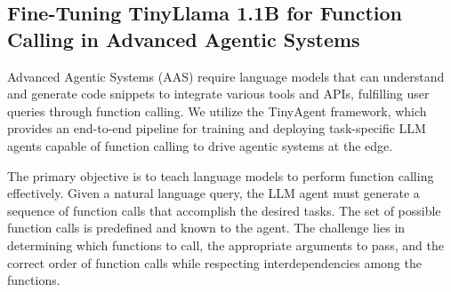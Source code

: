 




\subsection{Fine-Tuning TinyLlama 1.1B for Function Calling in Advanced Agentic Systems}

Advanced Agentic Systems (AAS) require language models that can understand and generate code snippets to integrate various tools and APIs, fulfilling user queries through function calling. We utilize the TinyAgent framework, which provides an end-to-end pipeline for training and deploying task-specific LLM agents capable of function calling \citep{tinyagent} to drive agentic systems at the edge.

The primary objective is to teach language models to perform function calling effectively. Given a natural language query, the LLM agent must generate a sequence of function calls that accomplish the desired tasks. The set of possible function calls is predefined and known to the agent. The challenge lies in determining which functions to call, the appropriate arguments to pass, and the correct order of function calls while respecting interdependencies among the functions.


